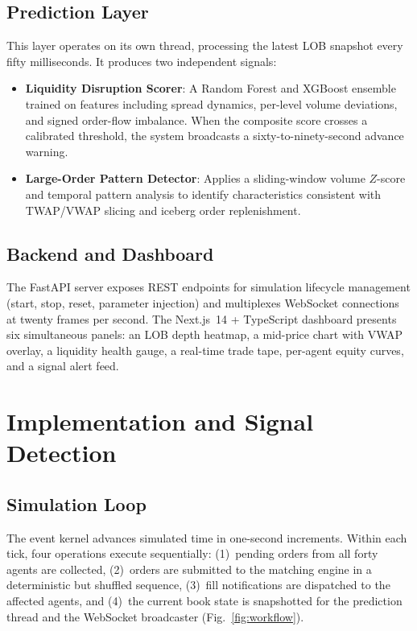\documentclass[conference]{IEEEtran}
\begin{document}
\subsection{Prediction Layer}

This layer operates on its own thread, processing the latest LOB
snapshot every fifty milliseconds. It produces two independent
signals:

\begin{itemize}
    \item \textbf{Liquidity Disruption Scorer}: A Random Forest and
    XGBoost ensemble trained on features including spread dynamics,
    per-level volume deviations, and signed order-flow imbalance.
    When the composite score crosses a calibrated threshold, the
    system broadcasts a sixty-to-ninety-second advance warning.

    \item \textbf{Large-Order Pattern Detector}: Applies a
    sliding-window volume $Z$-score and temporal pattern analysis to
    identify characteristics consistent with TWAP/VWAP slicing and
    iceberg order replenishment.
\end{itemize}

\subsection{Backend and Dashboard}

The FastAPI server exposes REST endpoints for simulation lifecycle
management (start, stop, reset, parameter injection) and multiplexes
WebSocket connections at twenty frames per second. The Next.js~14 +
TypeScript dashboard presents six simultaneous panels: an LOB depth
heatmap, a mid-price chart with VWAP overlay, a liquidity health
gauge, a real-time trade tape, per-agent equity curves, and a signal
alert feed.


\section{Implementation and Signal Detection}

\subsection{Simulation Loop}

The event kernel advances simulated time in one-second increments.
Within each tick, four operations execute sequentially: (1)~pending
orders from all forty agents are collected, (2)~orders are submitted
to the matching engine in a deterministic but shuffled sequence,
(3)~fill notifications are dispatched to the affected agents, and
(4)~the current book state is snapshotted for the prediction thread
and the WebSocket broadcaster (Fig.~\ref{fig:workflow}).
\end{document}
